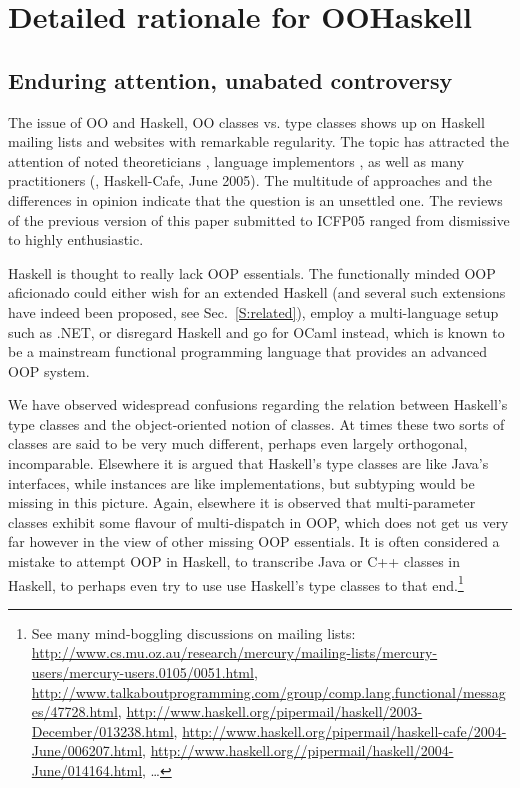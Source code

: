 \section{Detailed rationale for OOHaskell}
\label{S:rationale}






\subsection{Enduring attention, unabated controversy}

The issue of OO and Haskell, OO classes vs. type classes shows up on
Haskell mailing lists and websites with remarkable regularity. The
topic has attracted the attention of noted theoreticians
\cite{HS95,GJ96}, language implementors \cite{FLMPJ99, SPJ01}, as well
as many practitioners (\cite{MonadReader3}, Haskell-Cafe, June 2005).
The multitude of approaches and the differences in opinion indicate
that the question is an unsettled one. The reviews of the previous
version of this paper submitted to ICFP05 ranged from dismissive to
highly enthusiastic.

Haskell is thought to really lack OOP essentials. The functionally
minded OOP aficionado could either wish for an extended Haskell (and
several such extensions have indeed been proposed, see
Sec.~\ref{S:related}), employ a multi-language setup such as .NET, or
disregard Haskell and go for OCaml instead, which is known to be a
mainstream functional programming language that provides an advanced
OOP system.

We have observed widespread confusions regarding the relation between
Haskell's type classes and the object-oriented notion of classes. At
times these two sorts of classes are said to be very much different,
perhaps even largely orthogonal, incomparable. Elsewhere it is argued
that Haskell's type classes are like Java's interfaces, while
instances are like implementations, but subtyping would be missing in
this picture.  Again, elsewhere it is observed that multi-parameter
classes exhibit some flavour of multi-dispatch in OOP, which does not
get us very far however in the view of other missing OOP
essentials. It is often considered a mistake to attempt OOP in
Haskell, to transcribe Java or C++ classes in Haskell, to perhaps even
try to use use Haskell's type classes to that end.\footnote{\small See
many mind-boggling discussions on mailing lists:
\url{http://www.cs.mu.oz.au/research/mercury/mailing-lists/mercury-users/mercury-users.0105/0051.html},
\url{http://www.talkaboutprogramming.com/group/comp.lang.functional/messages/47728.html},
\url{http://www.haskell.org/pipermail/haskell/2003-December/013238.html},
\url{http://www.haskell.org/pipermail/haskell-cafe/2004-June/006207.html},
\url{http://www.haskell.org//pipermail/haskell/2004-June/014164.html},
\ldots } 


